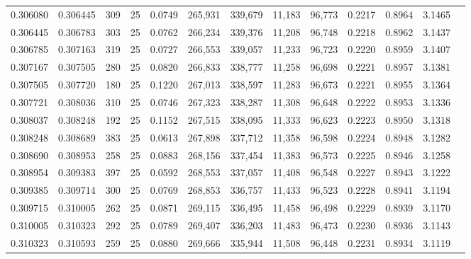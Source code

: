 \begin{tabular}{rrrrrrrrrrrrr}
0.306080 & 0.306445 &   309 &  25 &                                     0.0749 & 265,931 & 339,679 &  11,183 &  96,773 & 0.2217 & 0.8964 & 3.1465 \\
0.306445 & 0.306783 &   303 &  25 &                                     0.0762 & 266,234 & 339,376 &  11,208 &  96,748 & 0.2218 & 0.8962 & 3.1437 \\
0.306785 & 0.307163 &   319 &  25 &                                     0.0727 & 266,553 & 339,057 &  11,233 &  96,723 & 0.2220 & 0.8959 & 3.1407 \\
0.307167 & 0.307505 &   280 &  25 &                                     0.0820 & 266,833 & 338,777 &  11,258 &  96,698 & 0.2221 & 0.8957 & 3.1381 \\
0.307505 & 0.307720 &   180 &  25 &                                     0.1220 & 267,013 & 338,597 &  11,283 &  96,673 & 0.2221 & 0.8955 & 3.1364 \\
0.307721 & 0.308036 &   310 &  25 &                                     0.0746 & 267,323 & 338,287 &  11,308 &  96,648 & 0.2222 & 0.8953 & 3.1336 \\
0.308037 & 0.308248 &   192 &  25 &                                     0.1152 & 267,515 & 338,095 &  11,333 &  96,623 & 0.2223 & 0.8950 & 3.1318 \\
0.308248 & 0.308689 &   383 &  25 &                                     0.0613 & 267,898 & 337,712 &  11,358 &  96,598 & 0.2224 & 0.8948 & 3.1282 \\
0.308690 & 0.308953 &   258 &  25 &                                     0.0883 & 268,156 & 337,454 &  11,383 &  96,573 & 0.2225 & 0.8946 & 3.1258 \\
0.308954 & 0.309383 &   397 &  25 &                                     0.0592 & 268,553 & 337,057 &  11,408 &  96,548 & 0.2227 & 0.8943 & 3.1222 \\
0.309385 & 0.309714 &   300 &  25 &                                     0.0769 & 268,853 & 336,757 &  11,433 &  96,523 & 0.2228 & 0.8941 & 3.1194 \\
0.309715 & 0.310005 &   262 &  25 &                                     0.0871 & 269,115 & 336,495 &  11,458 &  96,498 & 0.2229 & 0.8939 & 3.1170 \\
0.310005 & 0.310323 &   292 &  25 &                                     0.0789 & 269,407 & 336,203 &  11,483 &  96,473 & 0.2230 & 0.8936 & 3.1143 \\
0.310323 & 0.310593 &   259 &  25 &                                     0.0880 & 269,666 & 335,944 &  11,508 &  96,448 & 0.2231 & 0.8934 & 3.1119 \\

\end{tabular}

